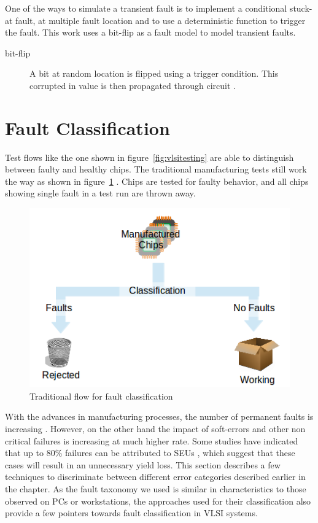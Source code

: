 One of the ways  to simulate a transient fault is to implement a conditional stuck-at fault, at multiple fault location and to use a deterministic function to trigger the fault. This work uses a bit-flip as a fault model to model transient faults.

\begin{description}
	\item[bit-flip] A bit at random location is flipped using a trigger condition. This corrupted in value is then propagated through circuit \cite{Gracia2001}. 
\end{description}

\section{Fault Classification}
\label{sec:secfc}
Test flows like the one shown in figure~\ref{fig:vlsitesting} are able to distinguish between faulty and healthy chips. The traditional manufacturing tests still work the way as shown in figure~\ref{fig:traditionaltestflow} \cite{Weste1985}. Chips are tested for faulty behavior, and all chips showing single fault in a test run are thrown away.

\begin{figure}[h]
  \begin{center}
    \captionsetup{justification=centering}
    \includegraphics[scale=0.75]{figures/traditionaltestflow.png}
    \caption{Traditional flow for fault classification}
    \label{fig:traditionaltestflow}
  \end{center}
\end{figure}

With the advances in manufacturing processes, the number of permanent faults is increasing \cite{kishore2009}. However, on the other hand the impact of soft-errors and other non critical failures is increasing at much higher rate\cite{Constantinescu2003}. Some studies have indicated that up to 80\% failures can be attributed to SEUs \cite{Iyer1986, Dharchoudhury1994, kishore2009}, which suggest that these cases will result in an unnecessary yield loss. This section describes a few techniques to discriminate between different error categories described earlier in the chapter. As the fault taxonomy we used is similar in characteristics to those observed on PCs or workstations, the approaches used for their classification also provide a few pointers towards fault classification in VLSI systems. 

